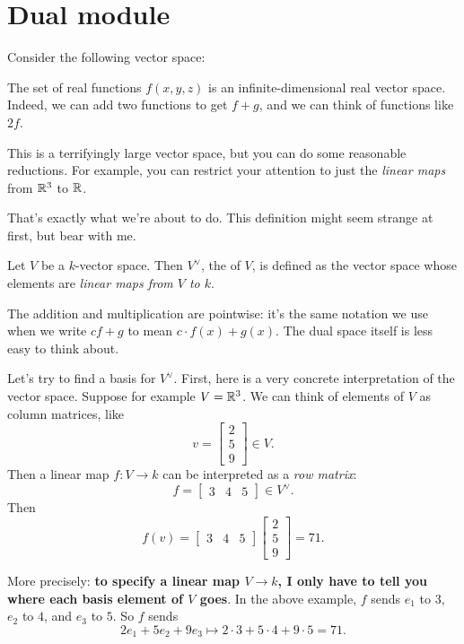 \section{Dual module}

Consider the following vector space:
\begin{example}
	The set of real functions $f(x,y,z)$ is an
	infinite-dimensional real vector space.
	Indeed, we can add two functions to get $f+g$,
	and we can think of functions like $2f$.
\end{example}
This is a terrifyingly large vector space,
but you can do some reasonable reductions.
For example, you can restrict your attention to just
the \emph{linear maps} from $\mathbb R^3$ to $\mathbb R$.

That's exactly what we're about to do.
This definition might seem strange at first, but bear with me.

\begin{definition}
	Let $V$ be a $k$-vector space.
	Then $V^\vee$, the  of $V$, is defined
	as the vector space whose elements are \emph{linear maps from $V$ to $k$}.
\end{definition}
The addition and multiplication are pointwise:
it's the same notation we use when we write $cf+g$ to mean $c \cdot f(x) + g(x)$.
The dual space itself is less easy to think about.

Let's try to find a basis for $V^\vee$.
First, here is a very concrete interpretation of the vector space.
Suppose for example $V = \mathbb R^3$.
We can think of elements of $V$ as column matrices, like
\[ v = \begin{bmatrix}
		2 \\ 5 \\ 9
	\end{bmatrix}
	\in V. \]
Then a linear map $f : V \to k$ can be interpreted as a \emph{row matrix}:
\[
	f = \begin{bmatrix}
		3 & 4 & 5
	\end{bmatrix}
	\in V^\vee. \]
Then
\[
	f(v) = \begin{bmatrix}
		3 & 4 & 5
	\end{bmatrix}
	\begin{bmatrix}
		2 \\ 5 \\ 9
	\end{bmatrix}
	= 71. \]

More precisely: \textbf{to specify a linear map $V \to k$,
I only have to tell you where each basis element of $V$ goes}.
In the above example, $f$ sends $e_1$ to $3$, $e_2$ to $4$, and $e_3$ to $5$.
So $f$ sends \[ 2e_1 + 5e_2 + 9e_3 \mapsto 2 \cdot 3 + 5 \cdot 4 + 9 \cdot 5 = 71. \]

